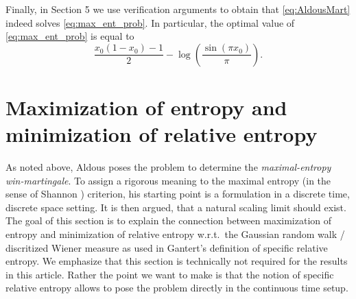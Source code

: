 \documentclass[reqno, a4paper]{amsart}
\theoremstyle{remark}
\newcommand{\1}{\mathbbm 1}
\numberwithin{equation}{section}
\numberwithin{theorem}{section}
\begin{document}
Finally, in Section 5  we use verification arguments to obtain that \eqref{eq:AldousMart}  indeed solves \eqref{eq:max_ent_prob}. In particular, the optimal value of \eqref{eq:max_ent_prob} is equal to
$$\frac{x_0(1-x_0)-1}{2}-\log\left(\frac{\sin(\pi x_0)}{\pi} \right ).$$


\section{Maximization of  entropy and minimization of relative entropy}

As noted above, 
Aldous  \cite{Al22a, Al22b}   poses the problem to determine the \emph{maximal-entropy win-martingale}. To assign a rigorous meaning to  the maximal entropy (in the sense of Shannon ) criterion, his starting point is a formulation in a discrete time, discrete space setting. It is then argued, that a natural scaling limit should exist. 
The goal of this section is to explain the connection between maximization of entropy and minimization of relative entropy  w.r.t.\  the Gaussian random walk / discritized Wiener measure as used in Gantert's definition of specific relative entropy. We emphasize that this section is technically  not required for the  results in this article. Rather the point we want to make is that the notion of  specific relative entropy allows to pose the problem directly in the continuous time setup. 
 
\end{document}
